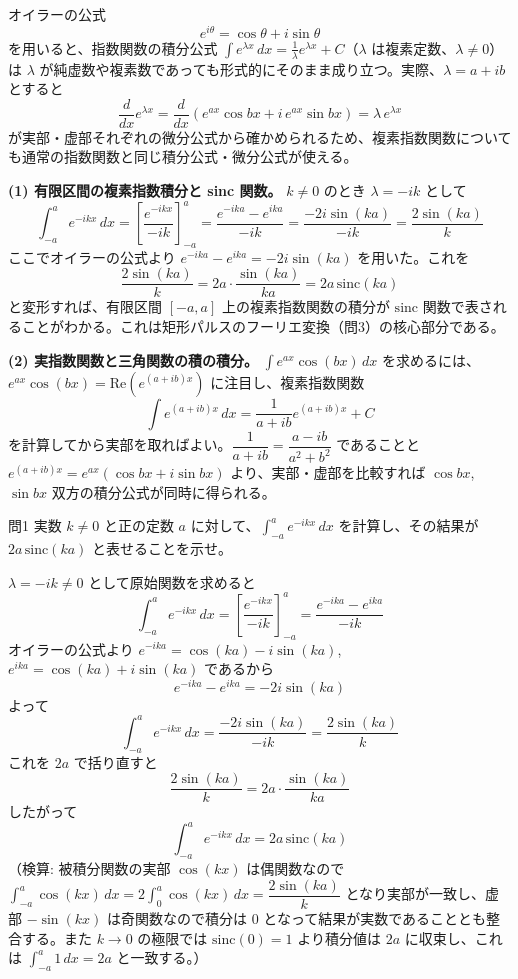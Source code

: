 \documentclass[a4paper,11pt]{article}
\begin{document}


\noindent
オイラーの公式
\[
e^{i\theta} = \cos\theta + i\sin\theta
\]
を用いると、指数関数の積分公式 $\displaystyle\int e^{\lambda x}\,dx = \frac{1}{\lambda}e^{\lambda x} + C$（$\lambda$ は複素定数、$\lambda \neq 0$）は $\lambda$ が純虚数や複素数であっても形式的にそのまま成り立つ。実際、$\lambda = a + ib$ とすると
\[
\frac{d}{dx}e^{\lambda x} = \frac{d}{dx}\left(e^{ax}\cos bx + i\,e^{ax}\sin bx\right)
= \lambda\,e^{\lambda x}
\]
が実部・虚部それぞれの微分公式から確かめられるため、複素指数関数についても通常の指数関数と同じ積分公式・微分公式が使える。

\medskip
\noindent
\textbf{(1) 有限区間の複素指数積分と sinc 関数。}
$k \neq 0$ のとき $\lambda = -ik$ として
\[
\int_{-a}^{a} e^{-ikx}\,dx = \left[\frac{e^{-ikx}}{-ik}\right]_{-a}^{a}
= \frac{e^{-ika} - e^{ika}}{-ik}
= \frac{-2i\sin(ka)}{-ik}
= \frac{2\sin(ka)}{k}
\]
ここでオイラーの公式より $e^{-ika} - e^{ika} = -2i\sin(ka)$ を用いた。これを
\[
\frac{2\sin(ka)}{k} = 2a\cdot\frac{\sin(ka)}{ka} = 2a\,\mathrm{sinc}(ka)
\]
と変形すれば、有限区間 $[-a,a]$ 上の複素指数関数の積分が $\mathrm{sinc}$ 関数で表されることがわかる。これは矩形パルスのフーリエ変換（問3）の核心部分である。

\medskip
\noindent
\textbf{(2) 実指数関数と三角関数の積の積分。}
$\displaystyle\int e^{ax}\cos(bx)\,dx$ を求めるには、$e^{ax}\cos(bx) = \mathrm{Re}\left(e^{(a+ib)x}\right)$ に注目し、複素指数関数
\[
\int e^{(a+ib)x}\,dx = \frac{1}{a+ib}e^{(a+ib)x} + C
\]
を計算してから実部を取ればよい。$\dfrac{1}{a+ib} = \dfrac{a-ib}{a^{2}+b^{2}}$ であることと $e^{(a+ib)x} = e^{ax}(\cos bx + i\sin bx)$ より、実部・虚部を比較すれば $\cos bx$, $\sin bx$ 双方の積分公式が同時に得られる。

\bigskip

\clearpage
\begin{mondaiboxS}{問1}
実数 $k \neq 0$ と正の定数 $a$ に対して、$\displaystyle\int_{-a}^{a} e^{-ikx}\,dx$ を計算し、その結果が $2a\,\mathrm{sinc}(ka)$ と表せることを示せ。
\end{mondaiboxS}
\kaitou
$\lambda = -ik \neq 0$ として原始関数を求めると
\[
\int_{-a}^{a} e^{-ikx}\,dx
= \left[\frac{e^{-ikx}}{-ik}\right]_{-a}^{a}
= \frac{e^{-ika} - e^{ika}}{-ik}
\]
オイラーの公式より $e^{-ika} = \cos(ka) - i\sin(ka)$, $e^{ika} = \cos(ka) + i\sin(ka)$ であるから
\[
e^{-ika} - e^{ika} = -2i\sin(ka)
\]
よって
\[
\int_{-a}^{a} e^{-ikx}\,dx = \frac{-2i\sin(ka)}{-ik} = \frac{2\sin(ka)}{k}
\]
これを $2a$ で括り直すと
\[
\frac{2\sin(ka)}{k} = 2a\cdot\frac{\sin(ka)}{ka}
\]
したがって
\[
\boxed{\; \int_{-a}^{a} e^{-ikx}\,dx = 2a\,\mathrm{sinc}(ka) \;}
\]
（検算: 被積分関数の実部 $\cos(kx)$ は偶関数なので $\displaystyle\int_{-a}^{a}\cos(kx)\,dx = 2\int_{0}^{a}\cos(kx)\,dx = \dfrac{2\sin(ka)}{k}$ となり実部が一致し、虚部 $-\sin(kx)$ は奇関数なので積分は $0$ となって結果が実数であることとも整合する。また $k \to 0$ の極限では $\mathrm{sinc}(0)=1$ より積分値は $2a$ に収束し、これは $\displaystyle\int_{-a}^{a}1\,dx = 2a$ と一致する。）
\end{document}
